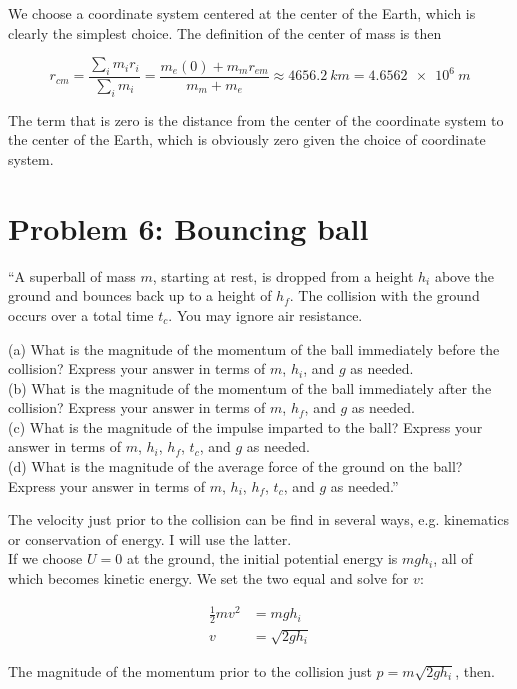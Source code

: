 \documentclass[8.01x]{subfiles}
\begin{document}
We choose a coordinate system centered at the center of the Earth, which is clearly the simplest choice. The definition of the center of mass is then

\begin{equation}
r_{cm} = \frac{\sum_i m_i r_i}{\sum_i m_i} = \frac{m_e (0) + m_m r_{em}}{m_m + m_e} \approx \SI{4656.2}{km} = \SI{4.6562e6}{m}
\end{equation}

The term that is zero is the distance from the center of the coordinate system to the center of the Earth, which is obviously zero given the choice of coordinate system.

\section{Problem 6: Bouncing ball}

``A superball of mass $m$, starting at rest, is dropped from a height $h_i$ above the ground and bounces back up to a height of $h_f$. The collision with the ground occurs over a total time $t_c$. You may ignore air resistance.

(a) What is the magnitude of the momentum of the ball immediately before the collision? Express your answer in terms of $m$, $h_i$, and $g$ as needed.\\
(b) What is the magnitude of the momentum of the ball immediately after the collision? Express your answer in terms of $m$, $h_f$, and $g$ as needed.\\
(c) What is the magnitude of the impulse imparted to the ball? Express your answer in terms of $m$, $h_i$, $h_f$, $t_c$, and $g$ as needed.\\
(d) What is the magnitude of the average force of the ground on the ball? Express your answer in terms of $m$, $h_i$, $h_f$, $t_c$, and $g$ as needed.''

The velocity just prior to the collision can be find in several ways, e.g. kinematics or conservation of energy. I will use the latter.\\
If we choose $U = 0$ at the ground, the initial potential energy is $m g h_i$, all of which becomes kinetic energy. We set the two equal and solve for $v$:

\begin{align}
\frac{1}{2} m v^2 &= m g h_i\\
v &= \sqrt{2 g h_i}
\end{align}

The magnitude of the momentum prior to the collision just $p = m \sqrt{2 g h_i}$, then.
\end{document}
